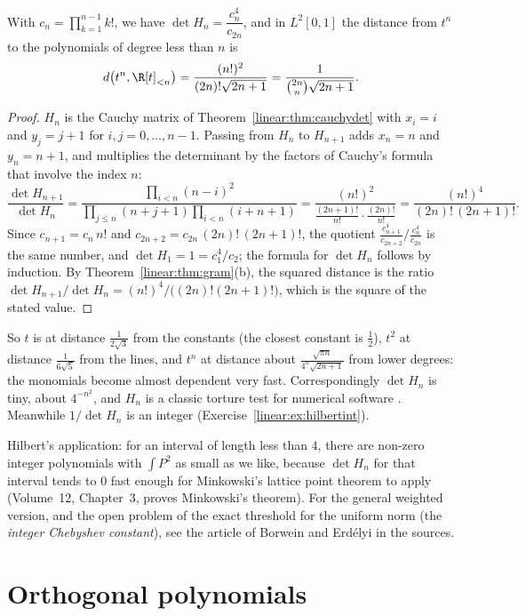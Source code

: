 \begin{corollary}\label{linear:cor:hilbert}
With $c_n=\prod_{k=1}^{n-1}k!$, we have $\det H_n=\dfrac{c_n^4}{c_{2n}}$, and in $L^2[0,1]$ the distance from $t^n$ to the
polynomials of degree less than $n$ is
\[
d\bigl(t^n,\R[t]_{<n}\bigr)=\frac{(n!)^2}{(2n)!\sqrt{2n+1}}=\frac1{\binom{2n}n\sqrt{2n+1}}.
\]
\end{corollary}
\begin{proof}
$H_n$ is the Cauchy matrix of Theorem~\ref{linear:thm:cauchydet} with $x_i=i$ and $y_j=j+1$ for $i,j=0,\dots,n-1$.
Passing from $H_n$ to $H_{n+1}$ adds $x_n=n$ and $y_n=n+1$, and multiplies the determinant by the factors of Cauchy's
formula that involve the index $n$:
\[
\frac{\det H_{n+1}}{\det H_n}=\frac{\prod_{i<n}(n-i)^2}{\prod_{j\le n}(n+j+1)\prod_{i<n}(i+n+1)}
=\frac{(n!)^2}{\frac{(2n+1)!}{n!}\cdot\frac{(2n)!}{n!}}=\frac{(n!)^4}{(2n)!\,(2n+1)!}.
\]
Since $c_{n+1}=c_n\,n!$ and $c_{2n+2}=c_{2n}\,(2n)!\,(2n+1)!$, the quotient $\frac{c_{n+1}^4}{c_{2n+2}}\big/\frac{c_n^4}{c_{2n}}$
is the same number, and $\det H_1=1=c_1^4/c_2$; the formula for $\det H_n$ follows by induction. By Theorem~\ref{linear:thm:gram}(b), the squared distance is the ratio
$\det H_{n+1}/\det H_n=(n!)^4/\bigl((2n)!(2n+1)!\bigr)$, which is the square of the stated value.
\end{proof}

So $t$ is at distance $\frac1{2\sqrt3}$ from the constants (the closest constant is $\frac12$), $t^2$ at distance
$\frac1{6\sqrt5}$ from the lines, and $t^n$ at distance about $\frac{\sqrt{\pi n}}{4^n\sqrt{2n+1}}$ from lower degrees: the
monomials become almost dependent very fast. Correspondingly $\det H_n$ is tiny, about $4^{-n^2}$, and $H_n$ is a
classic torture test for numerical software . Meanwhile $1/\det H_n$ is an integer
(Exercise~\ref{linear:ex:hilbertint}).

\begin{remark}
Hilbert's application: for an interval of length less than $4$, there are non-zero integer polynomials with
$\int P^2$ as small as we like, because $\det H_n$ for that interval tends to $0$ fast enough for Minkowski's lattice point
theorem to apply (Volume~12, Chapter~3, proves Minkowski's theorem). For the general weighted version, and the open problem
of the exact threshold for the uniform norm (the \emph{integer Chebyshev constant}), see the article of Borwein and
Erd\'elyi in the sources.
\end{remark}

\section{Orthogonal polynomials}

